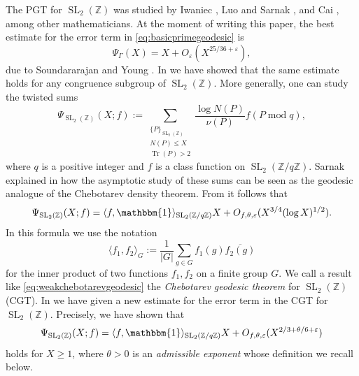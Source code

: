 \documentclass{article}
\theoremstyle{named}
\newcommand{\Z}{\mathbb{Z}}
\newcommand{\N}{\mathcal{N}}
\DeclareMathOperator{\SL}{SL}
\DeclareMathOperator{\Tr}{Tr}
\DeclareMathOperator{\modulo}{mod}
\begin{document}
The PGT for $\SL_2(\Z)$ was studied by Iwaniec \cite{Iwaniec1984}, Luo and Sarnak \cite{luosarnak}, and Cai \cite{Cai2002}, among other mathematicians.  At the moment of writing this paper, the best estimate for the error term in \eqref{eq:basicprimegeodesic} is
\begin{equation}\label{eq:strongprimegeodesic}
\Psi_\Gamma(X)  = X + O_\varepsilon(X^{25/36 + \varepsilon}),
\end{equation}
due to Soundararajan and Young \cite{Soundararajan_2013}. In \cite{reche2026chebotarevgeodesictheoremsplit} we have showed that the same estimate holds for any congruence subgroup of $\SL_2(\Z)$. More generally, one can study the twisted sums 
\begin{equation}\label{eq:defitwistedchebyshevsum}
    \Psi_{\SL_2(\Z)}(X; f) := \sum_{\substack{\{P\}_{\SL_2(\Z)}\\N(P)\leq X\\
    \Tr(P) > 2}}\frac{\log N(P)}{\nu(P)}f(P \modulo q),
\end{equation}
where $q$ is a positive integer and $f$ is a class function on $\SL_2(\Z/q\Z)$. Sarnak explained in \cite[Section 3]{sarnakthesis} how the asymptotic study of these sums can be seen as the geodesic analogue of the Chebotarev density theorem. From \cite[Chapter 10, Theorem 3.4]{hejhal2} it follows that 
\begin{equation}\label{eq:weakchebotarevgeodesic}
    \Psi_{\SL_2(\Z)}(X; f) =  \langle f, \mathbbm{1}\rangle_{\SL_2(\Z/q\Z)} X + O_{f, \theta, \varepsilon}(X^{3/4}(\log X)^{1/2}).
\end{equation}
In this formula we use the notation
\begin{equation*}
    \langle f_1, f_2 \rangle_G  := \frac{1}{|G|}\sum_{g \in G}f_1(g)\overline{f_2(g)}
\end{equation*}
for the inner product of two functions $f_1, f_2$ on a finite group $G$. We call a result like \eqref{eq:weakchebotarevgeodesic} the \emph{Chebotarev geodesic theorem} for $\SL_2(\Z)$ (CGT). In \cite{reche2026chebotarevgeodesictheoremsplit} we have given a new estimate for the error term in the CGT for $\SL_2(\Z)$. Precisely, we have shown that  
\begin{equation}\label{eq:strongchebotarevsplit}
    \Psi_{\SL_2(\Z)}(X; f) = \langle f, \mathbbm{1}\rangle_{\SL_2(\Z/q\Z)} X + O_{f, \theta, \varepsilon}(X^{2/3 + \theta/6 +\varepsilon})
\end{equation} 
holds for $X \geq 1$, where $\theta > 0$ is an \emph{admissible exponent} whose definition we recall below.
\end{document}
